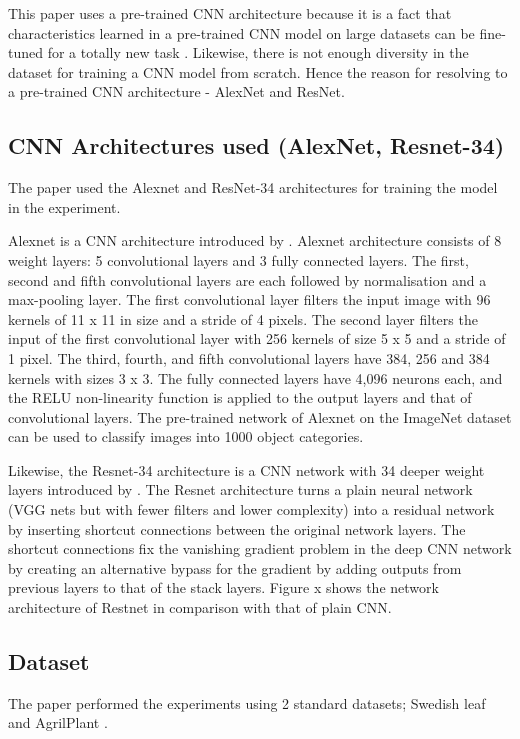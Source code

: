 \documentclass[conference]{IEEEtran}
\begin{document}
This paper uses a pre-trained CNN architecture because it is a fact that characteristics learned in a pre-trained CNN model on large datasets can be fine-tuned for a totally new task \cite{}. Likewise, there is not enough diversity in the dataset for training a CNN model from scratch. Hence the reason for resolving to a pre-trained CNN architecture - AlexNet and ResNet. 


\subsection{CNN Architectures used (AlexNet, Resnet-34)}
The paper used the Alexnet and ResNet-34 architectures for training the model in the experiment.

Alexnet is a CNN architecture introduced by \cite{krizhevsky2012imagenet}. Alexnet architecture consists of 8 weight layers: 5 convolutional layers and 3 fully connected layers. The first, second and fifth convolutional layers are each followed by normalisation and a max-pooling layer. The first convolutional layer filters the input image with 96 kernels of 11 x 11 in size and a stride of 4 pixels. The second layer filters the input of the first convolutional layer with 256 kernels of size 5 x 5 and a stride of 1 pixel. The third, fourth, and fifth convolutional layers have 384, 256 and 384 kernels with sizes 3 x 3. The fully connected layers have 4,096 neurons each, and the RELU non-linearity function is applied to the output layers and that of convolutional layers.
The pre-trained network of Alexnet on the ImageNet dataset can be used to classify images into 1000 object categories.

Likewise, the Resnet-34 architecture is a CNN network with 34 deeper weight layers introduced by \cite{he2016deep}. The Resnet architecture turns a plain neural network (VGG nets but with fewer filters and lower complexity) into a residual network by inserting shortcut connections between the original network layers. The shortcut connections fix the vanishing gradient problem in the deep CNN network by creating an alternative bypass for the gradient by adding outputs from previous layers to that of the stack layers. Figure x shows the network architecture of Restnet in comparison with that of plain CNN.


\subsection{Dataset}
The paper performed the experiments using 2 standard datasets; Swedish leaf \cite{soderkvist2001computer} and AgrilPlant \cite{pawara2017comparing}.
\end{document}
